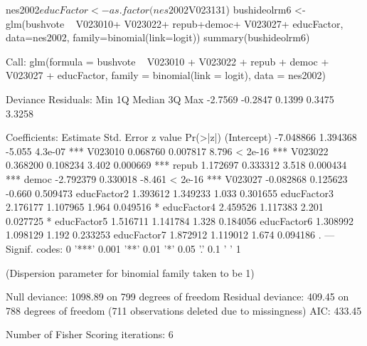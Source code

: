 \begin{Schunk}
\begin{Sinput}
 nes2002$educFactor <- as.factor(nes2002$V023131)
 bushideolrm6 <- glm(bushvote ~ V023010+ V023022+ repub+democ+ V023027+ educFactor, data=nes2002, family=binomial(link=logit))
 summary(bushideolrm6)
\end{Sinput}
\begin{Soutput}
Call:
glm(formula = bushvote ~ V023010 + V023022 + repub + democ + 
    V023027 + educFactor, family = binomial(link = logit), data = nes2002)

Deviance Residuals: 
    Min       1Q   Median       3Q      Max  
-2.7569  -0.2847   0.1399   0.3475   3.3258  

Coefficients:
             Estimate Std. Error z value Pr(>|z|)    
(Intercept) -7.048866   1.394368  -5.055  4.3e-07 ***
V023010      0.068760   0.007817   8.796  < 2e-16 ***
V023022      0.368200   0.108234   3.402 0.000669 ***
repub        1.172697   0.333312   3.518 0.000434 ***
democ       -2.792379   0.330018  -8.461  < 2e-16 ***
V023027     -0.082868   0.125623  -0.660 0.509473    
educFactor2  1.393612   1.349233   1.033 0.301655    
educFactor3  2.176177   1.107965   1.964 0.049516 *  
educFactor4  2.459526   1.117383   2.201 0.027725 *  
educFactor5  1.516711   1.141784   1.328 0.184056    
educFactor6  1.308992   1.098129   1.192 0.233253    
educFactor7  1.872912   1.119012   1.674 0.094186 .  
---
Signif. codes:  0 '***' 0.001 '**' 0.01 '*' 0.05 '.' 0.1 ' ' 1

(Dispersion parameter for binomial family taken to be 1)

    Null deviance: 1098.89  on 799  degrees of freedom
Residual deviance:  409.45  on 788  degrees of freedom
  (711 observations deleted due to missingness)
AIC: 433.45

Number of Fisher Scoring iterations: 6
\end{Soutput}
\end{Schunk}
